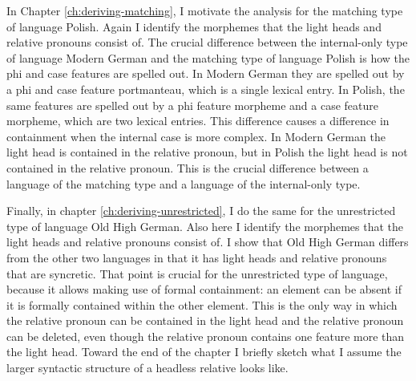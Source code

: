 In Chapter \ref{ch:deriving-matching}, I motivate the analysis for the matching type of language Polish. Again I identify the morphemes that the light heads and relative pronouns consist of. The crucial difference between the internal-only type of language Modern German and the matching type of language Polish is how the phi and case features are spelled out. In Modern German they are spelled out by a phi and case feature portmanteau, which is a single lexical entry. In Polish, the same features are spelled out by a phi feature morpheme and a case feature morpheme, which are two lexical entries. This difference causes a difference in containment when the internal case is more complex. In Modern German the light head is contained in the relative pronoun, but in Polish the light head is not contained in the relative pronoun. This is the crucial difference between a language of the matching type and a language of the internal-only type.

Finally, in chapter \ref{ch:deriving-unrestricted}, I do the same for the unrestricted type of language Old High German. Also here I identify the morphemes that the light heads and relative pronouns consist of. I show that Old High German differs from the other two languages in that it has light heads and relative pronouns that are syncretic. That point is crucial for the unrestricted type of language, because it allows making use of formal containment: an element can be absent if it is formally contained within the other element. This is the only way in which the relative pronoun can be contained in the light head and the relative pronoun can be deleted, even though the relative pronoun contains one feature more than the light head. Toward the end of the chapter I briefly sketch what I assume the larger syntactic structure of a headless relative looks like.
